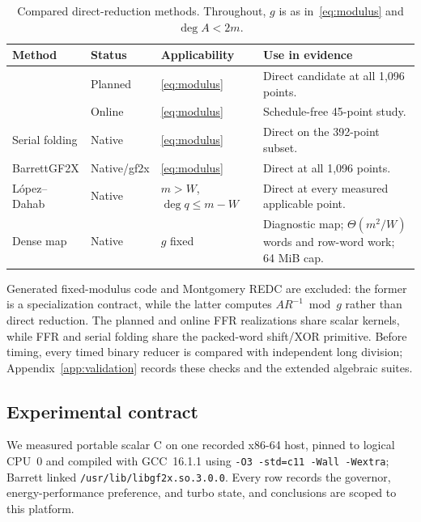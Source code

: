 \documentclass{mcom-l}
\numberwithin{equation}{section}
\theoremstyle{definition}
\theoremstyle{remark}
\begin{document}
\begin{table}[t]
\caption{Compared direct-reduction methods.  Throughout, $g$ is as
in~\eqref{eq:modulus} and $\deg A<2m$.}
\label{tab:families}
\vspace{0.5em}
\centering
\footnotesize
\renewcommand{\arraystretch}{1.12}
\begin{tabular}{@{}
  >{\centering\arraybackslash}m{}
  >{\centering\arraybackslash}m{}
  >{\centering\arraybackslash}m{}
  >{\raggedright\arraybackslash}m{}@{}}
\toprule
Method & Status & Applicability & Use in evidence\\
\midrule
\multirow{2}{*}{FFR} & Planned & \eqref{eq:modulus}
& Direct candidate at all 1,096 points.\\
\cmidrule(l){2-4}
& Online & \eqref{eq:modulus}
& Schedule-free 45-point study.\\
\midrule
Serial folding & Native & \eqref{eq:modulus}
& Direct on the 392-point subset.\\
\midrule
BarrettGF2X & Native/gf2x & \eqref{eq:modulus}
& Direct at all 1,096 points.\\
\midrule
L\'opez--Dahab & Native & $m>W$, $\deg q\le m-W$
& Direct at every measured applicable point.\\
\midrule
Dense map & Native & $g$ fixed
& Diagnostic map; $\Theta(m^2/W)$ words and row-word work; 64 MiB cap.\\
\bottomrule
\end{tabular}
\renewcommand{\arraystretch}{1}
\end{table}

Generated fixed-modulus code and Montgomery REDC are excluded: the former is
a specialization contract, while the latter computes $AR^{-1}\bmod g$ rather
than direct reduction.
The planned and online FFR realizations share scalar kernels, while FFR and
serial folding share the packed-word shift/XOR primitive.  Before timing,
every timed binary reducer is compared with independent long division;
Appendix~\ref{app:validation} records these checks and the extended algebraic
suites.

\subsection{Experimental contract}
\label{sec:experimental-contract}

We measured portable scalar C on one recorded x86-64 host, pinned to logical
CPU~0 and compiled with GCC~16.1.1 using
\texttt{-O3 -std=c11 -Wall -Wextra}; Barrett linked
\texttt{/usr/lib/libgf2x.so.3.0.0}.  Every row records the governor,
energy-performance preference, and turbo state, and conclusions are scoped to
this platform.
\end{document}
